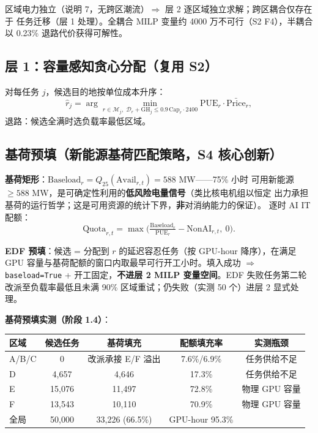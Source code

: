\documentclass{internal-report}
\begin{document}
区域电力独立（说明 7，无跨区潮流）$\Rightarrow$ 层 2 逐区域独立求解；跨区耦合仅存在于
任务迁移（层 1 处理）。全耦合 MILP 变量约 4000 万不可行（S2 F4），半耦合以 0.23\%
退路代价获得可解性。

\subsection{层 1：容量感知贪心分配（复用 S2）}

对每任务 $j$，候选目的地按单位成本升序：
\begin{equation}
  \hat{r}_j = \arg\min_{r \in \mathcal{M}_j,\; \mathcal{D}_r + \text{GH}_j \le 0.9\,\text{Cap}_r\cdot 2400}
  \text{PUE}_r \cdot \bar{\text{Price}}_r,
  \label{eq:assign}
\end{equation}
退路：候选全满时选负载率最低区域。

\subsection{基荷预填（新能源基荷匹配策略，S4 核心创新）}

\textbf{基荷矩形}：$\text{Baseload}_r = Q_{25}(\text{Avail}_{r,t}) = 588$ MW——75\% 小时
可用新能源 $\ge 588$ MW，是可确定性利用的\textbf{低风险电量信号}（类比核电机组以恒定
出力承担基荷的运行哲学；这是可用资源的统计下界，\textbf{非}对消纳能力的保证）。
逐时 AI IT 配额：
\begin{equation}
  \text{Quota}_{r,t} = \max\Big( \tfrac{\text{Baseload}_r}{\text{PUE}_r} - \text{NonAI}_{r,t},\ 0 \Big).
  \label{eq:quota}
\end{equation}

\textbf{EDF 预填}：候选 = 分配到 $r$ 的延迟容忍任务（按 GPU-hour 降序），在满足
GPU 容量与基荷配额的窗口内取最早可行开工小时。填入成功 $\Rightarrow$ \texttt{baseload=True}
+ 开工固定，\textbf{不进层 2 MILP 变量空间}。EDF 失败任务第二轮改派至负载率最低且未满
90\% 区域重试；仍失败（实测 50 个）进层 2 显式处理。

\textbf{基荷预填实测（阶段 1.4）}：
\begin{center}
\footnotesize
\begin{tabular}{lcccc}
\toprule
区域 & 候选任务 & 基荷填充 & 配额填充率 & 实测瓶颈 \\
\midrule
A/B/C & 0 & 改派承接 E/F 溢出 & 7.6\%/6.9\% & 任务供给不足 \\
D & 4,657 & 4,646 & 17.3\% & 任务供给不足 \\
E & 15,076 & 11,497 & 72.8\% & 物理 GPU 容量 \\
F & 13,543 & 10,110 & 70.9\% & 物理 GPU 容量 \\
\midrule
全局 & 50,000 & 33,226 (66.5\%) & GPU-hour 95.3\% & \\
\bottomrule
\end{tabular}
\end{center}
\end{document}
